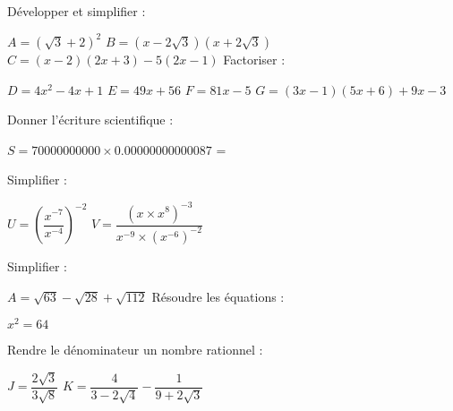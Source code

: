 \documentclass[a4paper,addpoints,12pt]{exam}
\begin{document}
\devoir[prv=false,ds=true , num=1 , niv=3 , date=03/11/2022 ]

\begin{exo}[7]
\begin{questions}
\begin{multicols}{2}
\question[3] Développer et simplifier :
 
$A=(\sqrt{3}+2)^{2}$
$B=(x-2\sqrt{3})(x+2\sqrt{3})$
$C=(x-2)(2x+3)-5(2x-1)$	
\columnbreak
\question[4] Factoriser :

$ D=4x^{2}-4x+1$
$E=49x+56$
$F=81x-5$
$G=(3x-1)(5x+6)+9x-3$
\end{multicols}
\end{questions}
\end{exo}

\begin{exo}[13]
\begin{questions}
\question[2] Donner l'écriture scientifique :

$ S=70000000000 \times 0.00000000000087$
=\vspace{10pt}
 \dotline[2pt]{\linewidth}\vspace{10pt}
 \dotline[2pt]{\linewidth}\vspace{10pt}
 \dotline[2pt]{\linewidth}\vspace{10pt}
 \dotline[2pt]{\linewidth}
\begin{multicols}{2}

\question[4] Simplifier :

$U=\left( \dfrac{x^{-7}}{x^{-4}}\right)^{-2}$
\columnbreak
$V=\dfrac{(x \times x^{8})^{-3}}{x^{-9}\times (x^{-6})^{-2}}$
\end{multicols}
\question[2] Simplifier :

$A=\sqrt{63}-\sqrt{28}+\sqrt{112}$
\question[2] Résoudre les équations :

$x^{2}=64$

\question[3] Rendre le dénominateur un nombre rationnel :

$J=\dfrac{2\sqrt{3}}{3\sqrt{8}}$
$K=\dfrac{4}{3-2\sqrt{4}}-\dfrac{1}{9+2\sqrt{3}}$
\end{questions}
\end{exo}
\end{document}
